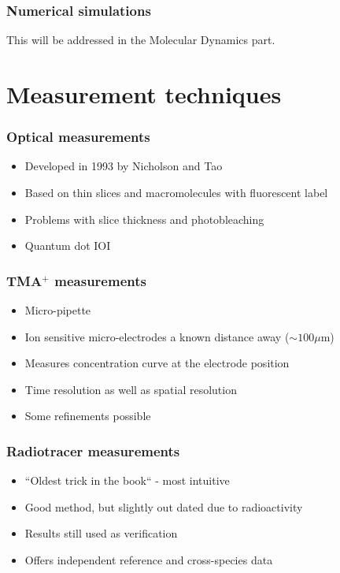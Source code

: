 \documentclass{beamer}
\begin{document}
 \begin{frame}
  \frametitle{Numerical simulations}
  This will be addressed in the Molecular Dynamics part.
 \end{frame}


\section{Measurement techniques}
 \begin{frame}
 \frametitle{Optical measurements}
 \begin{itemize}
  \item Developed in 1993 by Nicholson and Tao
  \item Based on thin slices and macromolecules with fluorescent label
  \item Problems with slice thickness and photobleaching
  \item Quantum dot IOI
 \end{itemize}
\end{frame}

 \begin{frame}
 \frametitle{TMA$^+$ measurements}
 \begin{itemize}
  \item Micro-pipette
  \item Ion sensitive micro-electrodes a known distance away ($\sim100\mu$m)
  \item Measures concentration curve at the electrode position
  \item Time resolution as well as spatial resolution
  \item Some refinements possible
 \end{itemize}
\end{frame}

 \begin{frame}
 \frametitle{Radiotracer measurements}
 \begin{itemize}
  \item ``Oldest trick in the book`` - most intuitive
  \item Good method, but slightly out dated due to radioactivity
  \item Results still used as verification
  \item Offers independent reference and cross-species data
 \end{itemize}

\end{frame}
\end{document}
